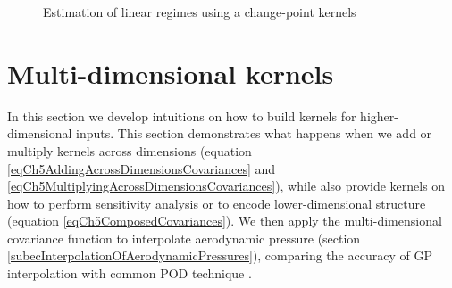\begin{figure}[!ht]
  \centering
    \quad
        \caption{Estimation of linear regimes using a change-point kernels}
        \label{figPosteriorChangePointKernel}
\end{figure}


\section{Multi-dimensional kernels}\label{secMultiDimensionalKernels}
In this section we develop intuitions on how to build kernels for higher-dimensional inputs. This section demonstrates what happens when we add or multiply kernels across dimensions (equation \ref{eqCh5AddingAcrossDimensionsCovariances} and \ref{eqCh5MultiplyingAcrossDimensionsCovariances}), while also provide kernels on how to perform sensitivity analysis or to encode lower-dimensional structure (equation \ref{eqCh5ComposedCovariances}). We then apply the multi-dimensional covariance function to interpolate aerodynamic pressure (section \ref{subecInterpolationOfAerodynamicPressures}), comparing the accuracy of GP interpolation with common POD technique \cite{oatao18004}. 

